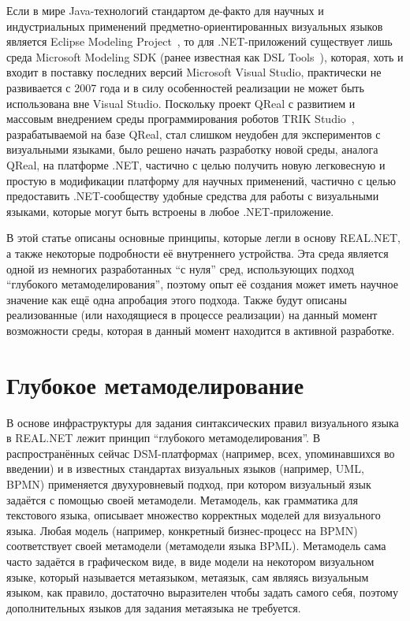 \documentclass{spisok-article}
\begin{document}
Если в мире Java-технологий стандартом де-факто для научных и индустриальных применений предметно-ориентированных визуальных языков является Eclipse Modeling Project~\cite{gronback2009eclipse}, то для .NET-приложений существует лишь среда Microsoft Modeling SDK (ранее известная как DSL Tools~\cite{cook2007domain}), которая, хоть и входит в поставку последних версий Microsoft Visual Studio, практически не развивается с 2007 года и в силу особенностей реализации не может быть использована вне Visual Studio. Поскольку проект QReal с развитием и массовым внедрением среды программирования роботов TRIK Studio~\cite{litvinov2015trikstudio}, разрабатываемой на базе QReal, стал слишком неудобен для экспериментов с визуальными языками, было решено начать разработку новой среды, аналога QReal, на платформе .NET, частично с целью получить новую легковесную и простую в модификации платформу для научных применений, частично с целью предоставить .NET-сообществу удобные средства для работы с визуальными языками, которые могут быть встроены в любое .NET-приложение.

В этой статье описаны основные принципы, которые легли в основу REAL.NET, а также некоторые подробности её внутреннего устройства. Эта среда является одной из немногих разработанных ``с нуля'' сред, использующих подход ``глубокого метамоделирования'', поэтому опыт её создания может иметь научное значение как ещё одна апробация этого подхода. Также будут описаны реализованные (или находящиеся в процессе реализации) на данный момент возможности среды, которая в данный момент находится в активной разработке.

\section{Глубокое метамоделирование}

В основе инфраструктуры для задания синтаксических правил визуального языка в REAL.NET лежит принцип ``глубокого метамоделирования''. В распространённых сейчас DSM-платформах (например, всех, упоминавшихся во введении) и в известных стандартах визуальных языков (например, UML, BPMN) применяется двухуровневый подход, при котором визуальный язык задаётся с помощью своей метамодели. Метамодель, как грамматика для текстового языка, описывает множество корректных моделей для визуального языка. Любая модель (например, конкретный бизнес-процесс на BPMN) соответствует своей метамодели (метамодели языка BPML). Метамодель сама часто задаётся в графическом виде, в виде модели на некотором визуальном языке, который называется метаязыком, метаязык, сам являясь визуальным языком, как правило, достаточно выразителен чтобы задать самого себя, поэтому дополнительных языков для задания метаязыка не требуется.
\end{document}
